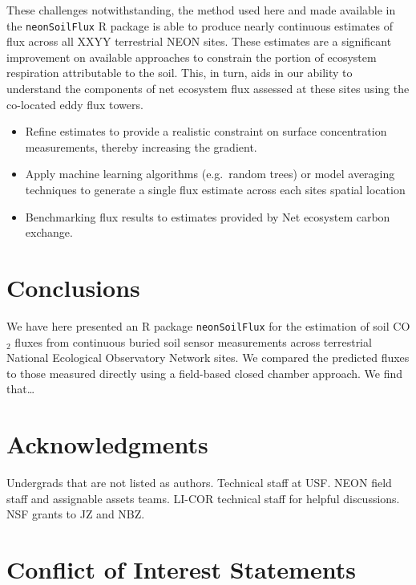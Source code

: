 \documentclass[
  letterpaper,
  DIV=11,
  numbers=noendperiod]{scrartcl}
\providecommand{\tightlist}{%
  \setlength{\itemsep}{0pt}\setlength{\parskip}{0pt}}\usepackage{longtable,booktabs,array}
\begin{document}
These challenges notwithstanding, the method used here and made
available in the \texttt{neonSoilFlux} R package is able to produce
nearly continuous estimates of flux across all XXYY terrestrial NEON
sites. These estimates are a significant improvement on available
approaches to constrain the portion of ecosystem respiration
attributable to the soil. This, in turn, aids in our ability to
understand the components of net ecosystem flux assessed at these sites
using the co-located eddy flux towers.

\begin{itemize}
\tightlist
\item
  Refine estimates to provide a realistic constraint on surface
  concentration measurements, thereby increasing the gradient.
\item
  Apply machine learning algorithms (e.g.~random trees) or model
  averaging techniques to generate a single flux estimate across each
  sites spatial location
\item
  Benchmarking flux results to estimates provided by Net ecosystem
  carbon exchange.
\end{itemize}

\section{Conclusions}\label{conclusions}

We have here presented an R package \texttt{neonSoilFlux} for the
estimation of soil CO\(_{2}\) fluxes from continuous buried soil sensor
measurements across terrestrial National Ecological Observatory Network
sites. We compared the predicted fluxes to those measured directly using
a field-based closed chamber approach. We find that\ldots{}

\section{Acknowledgments}\label{acknowledgments}

Undergrads that are not listed as authors. Technical staff at USF. NEON
field staff and assignable assets teams. LI-COR technical staff for
helpful discussions. NSF grants to JZ and NBZ.

\section{Conflict of Interest
Statements}\label{conflict-of-interest-statements}
\end{document}
